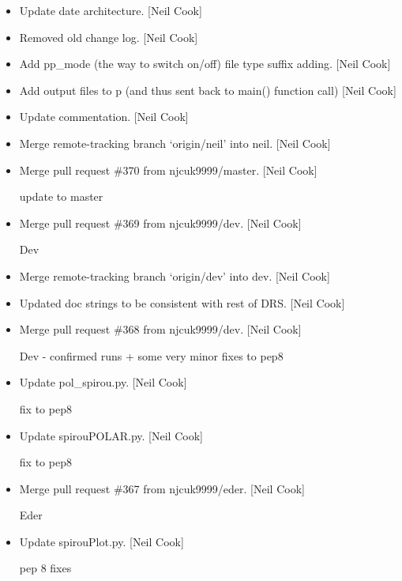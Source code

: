 \documentclass[a4paper,10pt,english]{report}
\begin{document}
\begin{itemize}
\item {} 
Update date architecture. {[}Neil Cook{]}

\item {} 
Removed old change log. {[}Neil Cook{]}

\item {} 
Add pp\_mode (the way to switch on/off) file type suffix adding. {[}Neil
Cook{]}

\item {} 
Add output files to p (and thus sent back to main() function call)
{[}Neil Cook{]}

\item {} 
Update commentation. {[}Neil Cook{]}

\item {} 
Merge remote-tracking branch ‘origin/neil’ into neil. {[}Neil Cook{]}

\item {} 
Merge pull request \#370 from njcuk9999/master. {[}Neil Cook{]}

update to master

\item {} 
Merge pull request \#369 from njcuk9999/dev. {[}Neil Cook{]}

Dev

\item {} 
Merge remote-tracking branch ‘origin/dev’ into dev. {[}Neil Cook{]}

\item {} 
Updated doc strings to be consistent with rest of DRS. {[}Neil Cook{]}

\item {} 
Merge pull request \#368 from njcuk9999/dev. {[}Neil Cook{]}

Dev - confirmed runs + some very minor fixes to pep8

\item {} 
Update pol\_spirou.py. {[}Neil Cook{]}

fix to pep8

\item {} 
Update spirouPOLAR.py. {[}Neil Cook{]}

fix to pep8

\item {} 
Merge pull request \#367 from njcuk9999/eder. {[}Neil Cook{]}

Eder

\item {} 
Update spirouPlot.py. {[}Neil Cook{]}

pep 8 fixes


\end{itemize}
\end{document}
